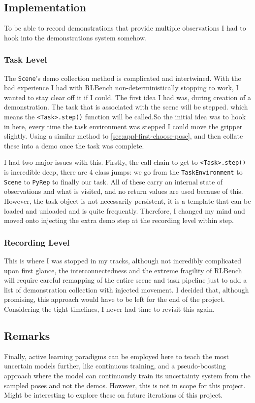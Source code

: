 \subsection{Implementation}
To be able to record demonstrations that provide multiple observations I had to hook into the demonstrations system somehow.

\subsubsection{Task Level}
The \verb|Scene|'s demo collection method is complicated and intertwined. With the bad experience I had with RLBench non-deterministically stopping to work, I wanted to stay clear off it if I could. The first idea I had was, during creation of a demonstration. The task that is associated with the scene will be stepped. which means the \verb|<Task>.step()| function will be called.So the initial idea was to hook in here, every time the task environment was stepped I could move the gripper slightly. Using a similar method to \ref{sec:appl-first-choose-pose}, and then collate these into a demo once the task was complete. 

I had two major issues with this. Firstly, the call chain to get to \verb|<Task>.step()| is incredible deep, there are 4 class jumps: we go from the \verb|TaskEnvironment| to \verb|Scene| to \verb|PyRep| to finally our task. All of these carry an internal state of observations and what is visited, and no return values are used because of this. However, the task object is not necessarily persistent, it is a template that can be loaded and unloaded and is quite frequently. Therefore, I changed my mind and moved onto injecting the extra demo step at the recording level within step.

\subsubsection{Recording Level}
This is where I was stopped in my tracks, although not incredibly complicated upon first glance, the interconnectedness and the extreme fragility of RLBench will require careful remapping of the entire scene and task pipeline just to add a list of demonstration collection with injected movement. I decided that, although promising, this approach would have to be left for the end of the project. Considering the tight timelines, I never had time to revisit this again.

\subsection{Remarks}
Finally, active learning paradigms can be employed here to teach the most uncertain models further, like continuous training, and a pseudo-boosting approach where the model can continuously train its uncertainty system from the sampled poses and not the demos. However, this is not in scope for this project. Might be interesting to explore these on future iterations of this project.